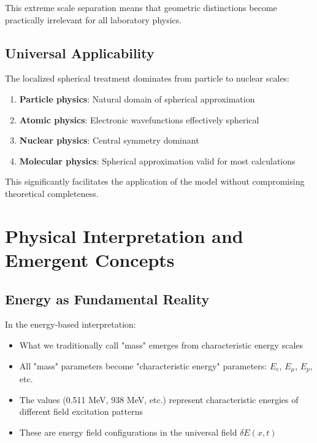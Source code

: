 \documentclass[12pt,a4paper]{report}
\begin{document}
	This extreme scale separation means that geometric distinctions become practically irrelevant for all laboratory physics.
	
	\subsection{Universal Applicability}
	\label{subsec:universal_applicability}
	
	The localized spherical treatment dominates from particle to nuclear scales:
	\begin{enumerate}
		\item \textbf{Particle physics}: Natural domain of spherical approximation
		\item \textbf{Atomic physics}: Electronic wavefunctions effectively spherical
		\item \textbf{Nuclear physics}: Central symmetry dominant
		\item \textbf{Molecular physics}: Spherical approximation valid for most calculations
	\end{enumerate}
	
	This significantly facilitates the application of the model without compromising theoretical completeness.
	
	\section{Physical Interpretation and Emergent Concepts}
	\label{sec:physical_interpretation}
	
	\subsection{Energy as Fundamental Reality}
	\label{subsec:energy_fundamental}
	
	In the energy-based interpretation:
	\begin{itemize}
		\item What we traditionally call "mass" emerges from characteristic energy scales
		\item All "mass" parameters become "characteristic energy" parameters: $E_e$, $E_\mu$, $E_p$, etc.
		\item The values (0.511 MeV, 938 MeV, etc.) represent characteristic energies of different field excitation patterns
		\item These are energy field configurations in the universal field $\delta E(x,t)$
	\end{itemize}
	
\end{document}
